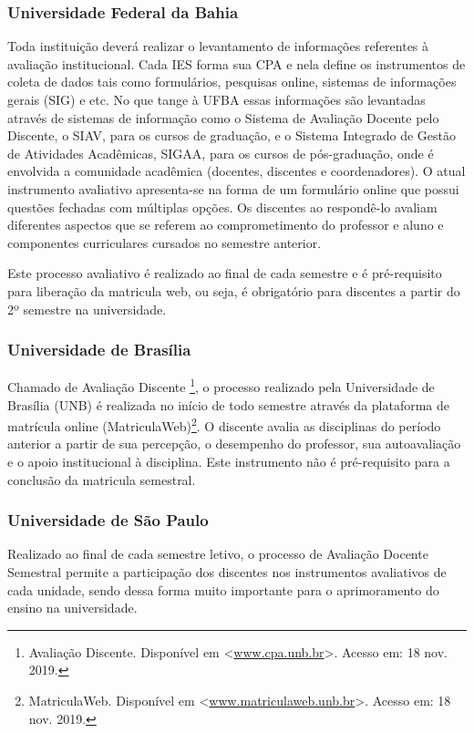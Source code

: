 \documentclass[12pt, a4paper]{report}
\begin{document}
 
 \subsubsection{Universidade Federal da Bahia}
 Toda instituição deverá realizar o levantamento de informações referentes à avaliação institucional. Cada \ac{IES} forma sua \ac{CPA} e nela define os instrumentos de coleta de dados tais como formulários, pesquisas online, sistemas de informações gerais (SIG) e etc. No que tange à UFBA essas informações são levantadas através de sistemas de informação como o Sistema de Avaliação Docente pelo Discente, o \ac{SIAV}, para os cursos de graduação, e o Sistema Integrado de Gestão de Atividades Acadêmicas, \ac{SIGAA}, para os cursos de pós-graduação, onde é envolvida a comunidade acadêmica (docentes, discentes e coordenadores).
 O atual instrumento avaliativo apresenta-se na forma de um formulário online que possui questões fechadas com múltiplas opções. Os discentes ao respondê-lo avaliam diferentes aspectos que se referem ao comprometimento do professor e aluno e componentes curriculares cursados no semestre anterior.
 
 Este processo avaliativo é realizado ao final de cada semestre e é pré-requisito para liberação da matricula web, ou seja, é obrigatório para discentes a partir do 2º semestre na universidade.
 
\subsubsection{Universidade de Brasília}
Chamado de Avaliação Discente \footnote{Avaliação Discente. Disponível em <\url{www.cpa.unb.br}>. Acesso em: 18 nov. 2019.}, o processo realizado pela Universidade de Brasília (UNB) é realizada no início de todo semestre através da plataforma de matrícula online (MatriculaWeb)\footnote{MatriculaWeb. Disponível em <\url{www.matriculaweb.unb.br}>. Acesso em: 18 nov. 2019.}. O discente avalia as disciplinas do período anterior a partir de sua percepção, o desempenho do professor, sua autoavaliação e o apoio institucional à disciplina. Este instrumento não é pré-requisito para a conclusão da matricula semestral.
 
\subsubsection{Universidade de São Paulo}

Realizado ao final de cada semestre letivo, o processo de Avaliação Docente Semestral permite a participação dos discentes nos instrumentos avaliativos de cada unidade, sendo dessa forma muito importante para o aprimoramento do ensino na universidade.
\end{document}
